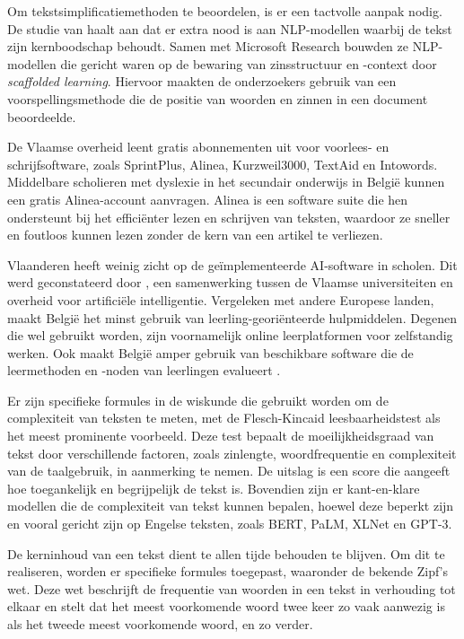Om tekstsimplificatiemethoden te beoordelen, is er een tactvolle aanpak nodig. De studie van \textcite{Swayamdipta2019} haalt aan dat er extra nood is aan NLP-modellen waarbij de tekst zijn kernboodschap behoudt. Samen met Microsoft Research bouwden ze NLP-modellen die gericht waren op de bewaring van zinsstructuur en -context door \emph{scaffolded learning}. Hiervoor maakten de onderzoekers gebruik van een voorspellingsmethode die de positie van woorden en zinnen in een document beoordeelde.

De Vlaamse overheid leent gratis abonnementen uit voor voorlees- en schrijfsoftware, zoals SprintPlus, Alinea, Kurzweil3000, TextAid en Intowords. Middelbare scholieren met dyslexie in het secundair onderwijs in België kunnen een gratis Alinea-account aanvragen. Alinea is een software suite die hen ondersteunt bij het efficiënter lezen en schrijven van teksten, waardoor ze sneller en foutloos kunnen lezen zonder de kern van een artikel te verliezen. 

Vlaanderen heeft weinig zicht op de geïmplementeerde AI-software in scholen. Dit werd geconstateerd door \autocite{Martens2021}, een samenwerking tussen de Vlaamse universiteiten en overheid voor artificiële intelligentie. Vergeleken met andere Europese landen, maakt België het minst gebruik van leerling-georiënteerde hulpmiddelen. Degenen die wel gebruikt worden, zijn voornamelijk online leerplatformen voor zelfstandig werken. Ook maakt België amper gebruik van beschikbare software die de leermethoden en -noden van leerlingen evalueert \autocite{Martens2021a}. 



Er zijn specifieke formules in de wiskunde die gebruikt worden om de complexiteit van teksten te meten, met de Flesch-Kincaid leesbaarheidstest als het meest prominente voorbeeld. Deze test bepaalt de moeilijkheidsgraad van tekst door verschillende factoren, zoals zinlengte, woordfrequentie en complexiteit van de taalgebruik, in aanmerking te nemen. De uitslag is een score die aangeeft hoe toegankelijk en begrijpelijk de tekst is. Bovendien zijn er kant-en-klare modellen die de complexiteit van tekst kunnen bepalen, hoewel deze beperkt zijn en vooral gericht zijn op Engelse teksten, zoals BERT, PaLM, XLNet en GPT-3.

De kerninhoud van een tekst dient te allen tijde behouden te blijven. Om dit te realiseren, worden er specifieke formules toegepast, waaronder de bekende Zipf's wet. Deze wet beschrijft de frequentie van woorden in een tekst in verhouding tot elkaar en stelt dat het meest voorkomende woord twee keer zo vaak aanwezig is als het tweede meest voorkomende woord, en zo verder.

